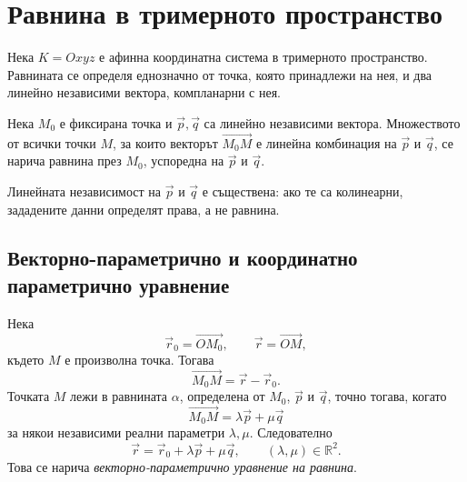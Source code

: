 \begin{konspekt}
\end{konspekt}

\section{Равнина в тримерното пространство}\label{s:29.1}

Нека $K=Oxyz$ е афинна координатна система в тримерното пространство. Равнината се определя еднозначно от точка, която принадлежи на нея, и два линейно независими вектора, компланарни с нея.

\begin{defn}
Нека $M_0$ е фиксирана точка и $\vec p,\vec q$ са линейно независими вектора. Множеството от всички точки $M$, за които векторът $\overrightarrow{M_0M}$ е линейна комбинация на $\vec p$ и $\vec q$, се нарича равнина през $M_0$, успоредна на $\vec p$ и $\vec q$.
\end{defn}

Линейната независимост на $\vec p$ и $\vec q$ е съществена: ако те са колинеарни, зададените данни определят права, а не равнина.

\subsection{Векторно-параметрично и координатно параметрично уравнение}\label{s:29.1.1}

Нека
\[
\vec r_0=\overrightarrow{OM_0},\qquad
\vec r=\overrightarrow{OM},
\]
където $M$ е произволна точка. Тогава
\[
\overrightarrow{M_0M}=\vec r-\vec r_0.
\]
Точката $M$ лежи в равнината $\alpha$, определена от $M_0$, $\vec p$ и $\vec q$, точно тогава, когато
\[
\overrightarrow{M_0M}=\lambda\vec p+\mu\vec q
\]
за някои независими реални параметри $\lambda,\mu$. Следователно
\[
\boxed{\vec r=\vec r_0+\lambda\vec p+\mu\vec q,\qquad
(\lambda,\mu)\in\mathbb R^2.}
\]
Това се нарича \emph{векторно-параметрично уравнение на равнина}.

